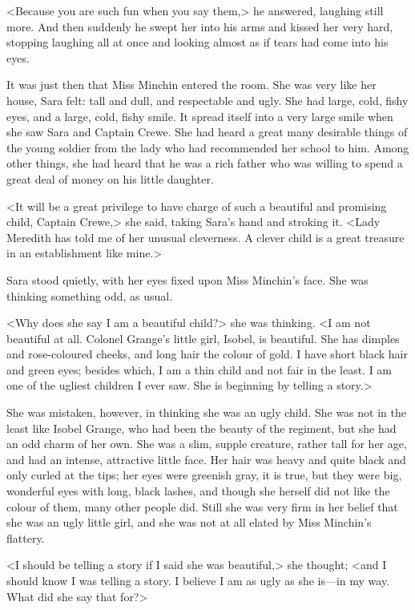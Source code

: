 <Because you are such fun when you say them,> he answered, laughing still more. And then suddenly he swept her into his arms and kissed her very hard, stopping laughing all at once and looking almost as if tears had come into his eyes.

It was just then that Miss Minchin entered the room. She was very like her house, Sara felt: tall and dull, and respectable and ugly. She had large, cold, fishy eyes, and a large, cold, fishy smile. It spread itself into a very large smile when she saw Sara and Captain Crewe. She had heard a great many desirable things of the young soldier from the lady who had recommended her school to him. Among other things, she had heard that he was a rich father who was willing to spend a great deal of money on his little daughter.

<It will be a great privilege to have charge of such a beautiful and promising child, Captain Crewe,> she said, taking Sara's hand and stroking it. <Lady Meredith has told me of her unusual cleverness. A clever child is a great treasure in an establishment like mine.>

Sara stood quietly, with her eyes fixed upon Miss Minchin's face. She was thinking something odd, as usual.

<Why does she say I am a beautiful child?> she was thinking. <I am not beautiful at all. Colonel Grange's little girl, Isobel, is beautiful. She has dimples and rose-coloured cheeks, and long hair the colour of gold. I have short black hair and green eyes; besides which, I am a thin child and not fair in the least. I am one of the ugliest children I ever saw. She is beginning by telling a story.>

She was mistaken, however, in thinking she was an ugly child. She was not in the least like Isobel Grange, who had been the beauty of the regiment, but she had an odd charm of her own. She was a slim, supple creature, rather tall for her age, and had an intense, attractive little face. Her hair was heavy and quite black and only curled at the tips; her eyes were greenish gray, it is true, but they were big, wonderful eyes with long, black lashes, and though she herself did not like the colour of them, many other people did. Still she was very firm in her belief that she was an ugly little girl, and she was not at all elated by Miss Minchin's flattery.

<I should be telling a story if I said she was beautiful,> she thought; <and I should know I was telling a story. I believe I am as ugly as she is—in my way. What did she say that for?>

